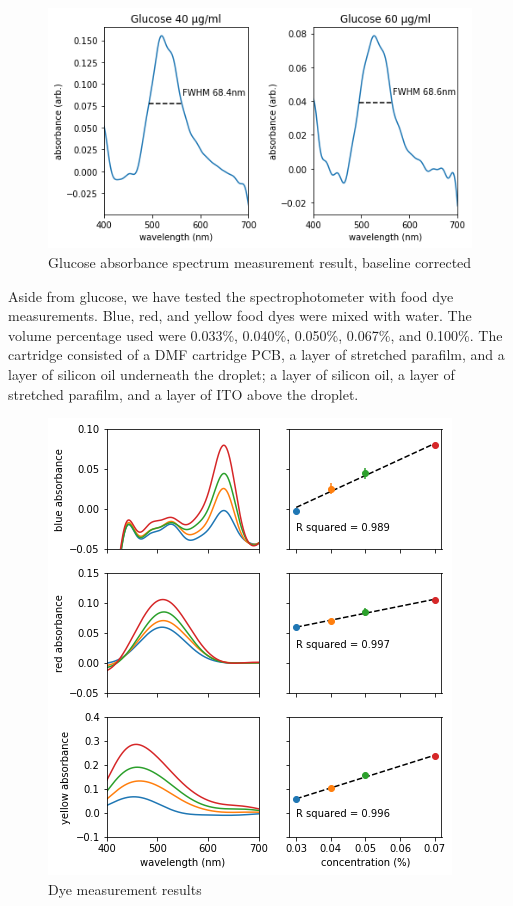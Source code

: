 \documentclass[conference]{IEEEtran}
\begin{document}
    \begin{figure}[htbp]
    \centerline{\includegraphics[scale=0.5]{glucose-res.png}}
    \caption{Glucose absorbance spectrum measurement result, baseline corrected}
    \label{glucose_result}
    \end{figure}

Aside from glucose, we have tested the spectrophotometer with food dye measurements.
Blue, red, and yellow food dyes were mixed with water.
The volume percentage used were 0.033\%, 0.040\%, 0.050\%, 0.067\%, and 0.100\%.
The cartridge consisted of a DMF cartridge PCB, a layer of stretched parafilm, and a layer of silicon oil underneath the droplet;
a layer of silicon oil, a layer of stretched parafilm, and a layer of ITO above the droplet. 

\begin{figure}[htbp]
    \centerline{\includegraphics[scale=0.6]{dye-res.png}}

    \caption{Dye measurement results}
    \label{dye_res}
    \end{figure}
\end{document}
